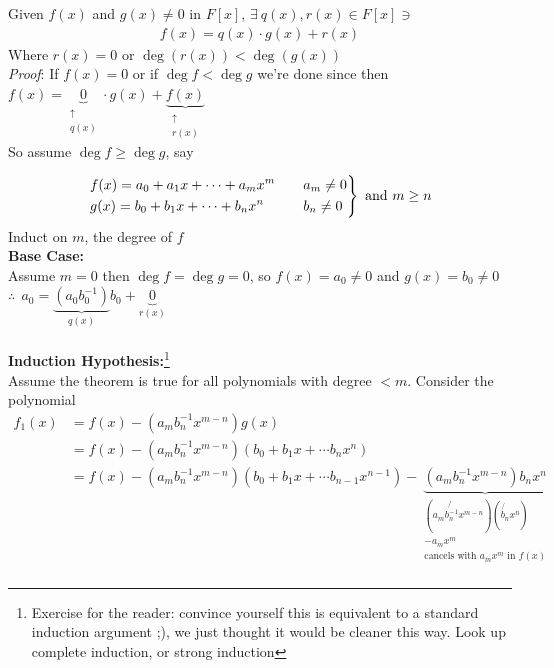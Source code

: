 \setcounter{dummy_lemma}{1}
\begin{lemma}
Given $f(x)$ and $g(x)\neq 0$ in $F[x]$, $\exists \ q(x), r(x) \in F[x] \ni $
\begin{align}
    f(x) = q(x)\cdot g(x) + r(x) \nonumber
\end{align}
Where $r(x)=0$ or $\deg(r(x)) < \deg(g(x))$ \\ \steezybreak
\textit{Proof}: If $f(x)=0$ or if $\deg f < \deg g$ we're done since then
$f(x)=\underbrace{0}_{\substack{\uparrow \\ q(x)}}\cdot g(x)+\underbrace{f(x)}_{\substack{\uparrow \\ r(x)}}$
\\
So assume $\deg f \geq \deg g$, say

\begin{align}
    \begin{drcases}
        f(x) = a_0 + a_1 x+ \cdots + a_m x^m \ \ \ &a_m \neq 0 \nonumber \\
        g(x) = b_0 + b_1 x+ \cdots + b_n x^n \ \ \ &b_n \neq 0 \nonumber
    \end{drcases} \text{ and }m\geq n
\end{align}
Induct on $m$, the degree of $f$
\noindent \\ \steezybreak
\textbf{Base Case:} \\  \steezybreak
Assume $m=0$ then $\deg f=\deg g = 0$, so $f(x) = a_0 \neq 0$ and $g(x)=b_0\neq 0$ \\
\noindent $\therefore \ \ a_0 = \underbrace{(a_0 b_0^{-1})}_{q(x)}b_0 + \underbrace{0}_{r(x)}$ \\
\steezybreak
\\ \steezybreak
\noindent \textbf{Induction Hypothesis:}\footnote{Exercise for the reader: convince yourself this is
equivalent to a standard induction argument ;), we just thought it would be cleaner this way. Look
up complete induction, or strong induction} \\ \steezybreak
\noindent Assume the theorem is true for all polynomials with degree $< m$. Consider the polynomial
\begin{align}
    f_1(x) &= f(x) - (a_m b_n^{-1}x^{m-n})g(x) \nonumber \\
    &= f(x)-(a_m b_n^{-1}x^{m-n})(b_0+b_1x+\cdots b_nx^n) \nonumber \\
    &= f(x)-(a_m b_n^{-1}x^{m-n})(b_0+b_1x+\cdots b_{n-1}x^{n-1})- \underbrace{(a_m b_n^{-1}x^{m-n})b_nx^n}_{\substack{(a_m\not{b_n^{-1}}x^{m-n})(\not{b_n}x^n) \\ -a_mx^m \\ \text{cancels with }a_mx^m \text{ in }f(x)}}\nonumber \\

\end{align}
\end{lemma}
